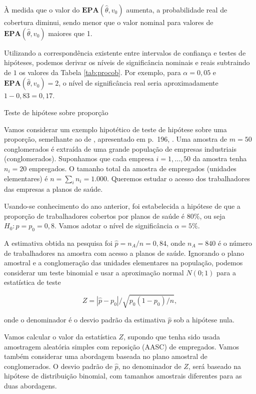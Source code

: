 \documentclass[]{book}
\theoremstyle{definition}
\theoremstyle{definition}
\theoremstyle{definition}
\theoremstyle{remark}
\let\BeginKnitrBlock\begin \let\EndKnitrBlock\end
\begin{document}
À medida que o valor do \(\mathbf{EPA}\left( \hat{\theta},v_{0}\right)\)
aumenta, a probabilidade real de cobertura diminui, sendo menor que o
valor nominal para valores de
\(\mathbf{EPA}\left( \hat{\theta},v_{0}\right)\) maiores que 1.

Utilizando a correspondência existente entre intervalos de confiança e
testes de hipóteses, podemos derivar os níveis de significância nominais
e reais subtraindo de \(1\) os valores da Tabela \ref{tab:procob}. Por
exemplo, para \(\alpha =0,05\) e
\(\mathbf{EPA}\left( \hat{\theta},v_{0}\right) =2\), o nível de
significância real seria aproximadamente \(1-0,83=0,17\).

\BeginKnitrBlock{example}
\protect\hypertarget{exm:exebin}{}{\label{exm:exebin} }Teste de hipótese
sobre proporção
\EndKnitrBlock{example} Vamos considerar um exemplo hipotético de teste
de hipótese sobre uma proporção, semelhante ao de \citep{Sud76},
apresentado em p.~196, \citep{lethonen}. Uma amostra de \(m=50\)
conglomerados é extraída de uma grande população de empresas industriais
(conglomerados). Suponhamos que cada empresa \(i=1,\ldots ,50\) da
amostra tenha \(n_{i}=20\) empregados. O tamanho total da amostra de
empregados (unidades elementares) é \(n=\sum_{i}n_{i}=1.000\). Queremos
estudar o acesso dos trabalhadores das empresas a planos de saúde.

Usando-se conhecimento do ano anterior, foi estabelecida a hipótese de
que a proporção de trabalhadores cobertos por planos de saúde é
\(80\%\), ou seja \(H_{0}:p=p_{0}=0,8\). Vamos adotar o nível de
significância \(\alpha =5\%\).

A estimativa obtida na pesquisa foi \(\widehat{p}=n_{A}/n=0,84\), onde
\(n_{A}=840\) é o número de trabalhadores na amostra com acesso a planos
de saúde. Ignorando o plano amostral e a conglomeração das unidades
elementares na população, podemos considerar um teste binomial e usar a
aproximação normal \(N(0;1)\) para a estatística de teste

\begin{equation}
Z=|\widehat{p}-p_{0}|/\sqrt{p_{0}\left( 1-p_{0}\right) /n},  \label{eq:epa4}
\end{equation}

onde o denominador é o desvio padrão da estimativa \(\widehat{p}\) sob a
hipótese nula.

Vamos calcular o valor da estatística \(Z\), supondo que tenha sido
usada amostragem aleatória simples com reposição (AASC) de empregados.
Vamos também considerar uma abordagem baseada no plano amostral de
conglomerados. O desvio padrão de \(\widehat{p}\), no denominador de
\(Z\), será baseado na hipótese de distribuição binomial, com tamanhos
amostrais diferentes para as duas abordagens.
\end{document}
